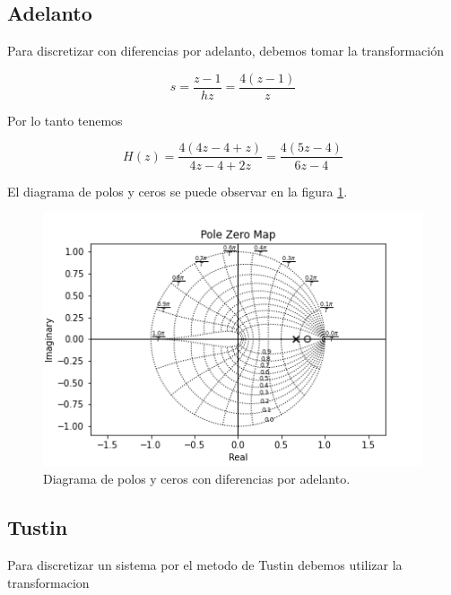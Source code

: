 \documentclass{article}
\begin{document}
        \subsection{Adelanto}

        Para discretizar con diferencias por adelanto, debemos tomar la transformación 

        \begin{equation}
            s = \frac{z - 1}{hz} = \frac{ 4(z-1) }{z}
        \end{equation}

        Por lo tanto tenemos 

        \begin{equation}
            H(z) = \frac{4( 4z - 4 + z )}{4z -4 + 2z} = \frac{4( 5z - 4 )}{6z - 4}
        \end{equation}

        El diagrama de polos y ceros se puede observar en la figura \ref{fig:3-adelanto}.

        \begin{figure}[!htb]
            \centering
            \includegraphics[width=\textwidth]{Img/3-adelanto.png}
            \caption{Diagrama de polos y ceros con diferencias por adelanto.}
            \label{fig:3-adelanto}
        \end{figure}

        \subsection{Tustin}

        Para discretizar un sistema por el metodo de Tustin debemos utilizar la transformacion 
\end{document}
